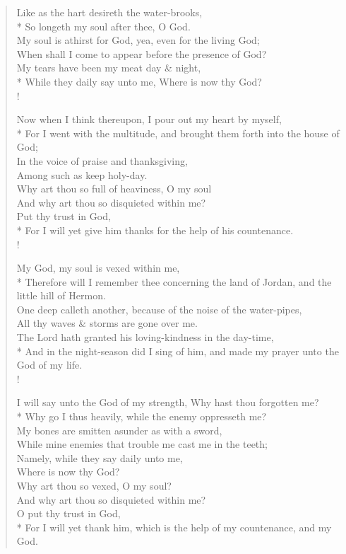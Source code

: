 \documentclass[MAIN]{subfiles}
\begin{document}
\begin{verse}
Like as the hart desireth the water-brooks,\\*
\vin So longeth my soul after thee, O God.\\
My soul is athirst for God, yea, even for the living God;\\
\vin When shall I come to appear before the presence of God?\\
My tears have been my meat day \& night,\\*
\vin While they daily say unto me, Where is now thy God?\\!

Now when I think thereupon, I pour out my heart by myself,\\*
\vin For I went with the multitude, and brought them forth into the house of God;\\
In the voice of praise and thanksgiving,\\
\vin Among such as keep holy-day.\\
Why art thou so full of heaviness, O my soul\\
\vin And why art thou so disquieted within me?\\
Put thy trust in God,\\*
\vin For I will yet give him thanks for the help of his countenance.\\!

My God, my soul is vexed within me,\\*
\vin Therefore will I remember thee concerning the land of {\sc Jordan}, and the little hill of {\sc Hermon}.\\
One deep calleth another, because of the noise of the water-pipes,\\
\vin All thy waves \& storms are gone over me.\\
The Lord hath granted his loving-kindness in the day-time,\\*
\vin And in the night-season did I sing of him, and made my prayer unto the God of my life.\\!

I will say unto the God of my strength, Why hast thou forgotten me?\\*
\vin Why go I thus heavily, while the enemy oppresseth me?\\
My bones are smitten asunder as with a sword,\\
\vin While mine enemies that trouble me cast me in the teeth;\\
Namely, while they say daily unto me,\\
\vin Where is now thy God?\\
Why art thou so vexed, O my soul?\\
\vin And why art thou so disquieted within me?\\
O put thy trust in God,\\*
\vin For I will yet thank him, which is the help of my countenance, and my God.\\
\end{verse}
\end{document}
